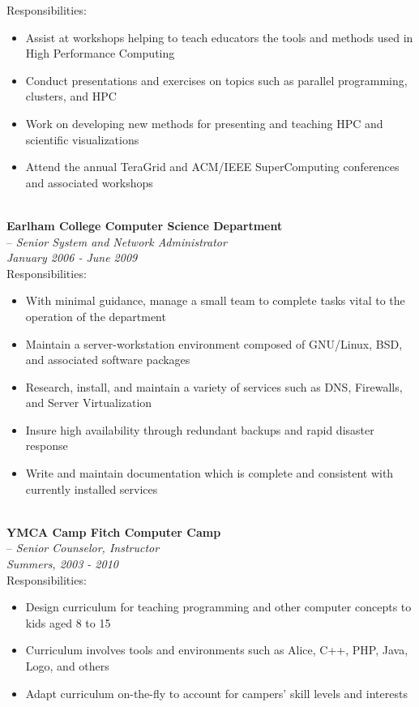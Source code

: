 \documentclass[10pt]{article}
\begin{document}
\indent Responsibilities:
\begin{itemize}
  \addtolength{\itemsep}{-2mm}
    \item \indent Assist at workshops helping to teach educators the tools and methods used in High Performance Computing
    \item \indent Conduct presentations and exercises on topics such as parallel programming, clusters, and HPC
    \item \indent Work on developing new methods for presenting and teaching HPC and scientific visualizations
    \item \indent Attend the annual TeraGrid and ACM/IEEE SuperComputing conferences and associated workshops
\end{itemize}
~\\
\indent\textbf{Earlham College Computer Science Department}~\\
\indent \indent -- \emph{Senior System and Network Administrator}~\\
\indent\textit{January 2006 - June 2009}~\\
\indent Responsibilities:
  \begin{itemize}
  \addtolength{\itemsep}{-2mm}
    \item \indent With minimal guidance, manage a small team to complete tasks vital to the operation of the department
    \item \indent Maintain a server-workstation environment composed of GNU/Linux, BSD, and associated software packages
    \item \indent Research, install, and maintain a variety of services such as DNS, Firewalls, and Server Virtualization
    \item \indent Insure high availability through redundant backups and rapid disaster response
    \item \indent Write and maintain documentation which is complete and consistent with currently installed services
  \end{itemize}
~\\
\indent\textbf{YMCA Camp Fitch Computer Camp}~\\
\indent \indent -- \emph{Senior Counselor, Instructor}~\\
\indent\textit{Summers, 2003 - 2010}~\\
\indent Responsibilities:
  \begin{itemize}
  \addtolength{\itemsep}{-2mm}
    \item \indent Design curriculum for teaching programming and other computer concepts to kids aged 8 to 15
    \item \indent Curriculum involves tools and environments such as Alice, C++, PHP, Java, Logo, and others
    \item \indent Adapt curriculum on-the-fly to account for campers' skill levels and interests
  \end{itemize}
\end{document}
